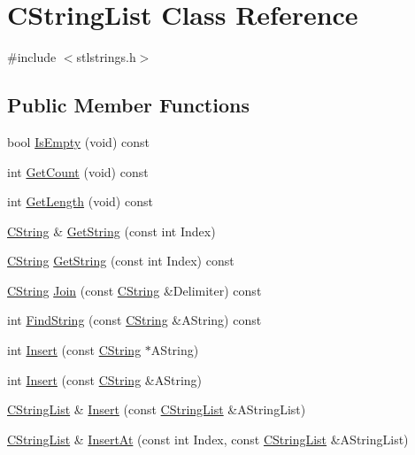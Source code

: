\hypertarget{classCStringList}{\section{C\-String\-List Class Reference}
\label{classCStringList}
}


{\ttfamily \#include $<$stlstrings.\-h$>$}

\subsection*{Public Member Functions}
\begin{DoxyCompactItemize}
\item 
bool \hyperlink{classCStringList_a9aad005c9fc328d8c1fff768444d1bc7}{Is\-Empty} (void) const 
\item 
int \hyperlink{classCStringList_a8a5c522ad2de73b4d27d73101a3e7f19}{Get\-Count} (void) const 
\item 
int \hyperlink{classCStringList_a166f5b12d4505567b01c149204418282}{Get\-Length} (void) const 
\item 
\hyperlink{classCString}{C\-String} \& \hyperlink{classCStringList_a92cf7329bf278bc02f364f64a328f5d8}{Get\-String} (const int Index)
\item 
\hyperlink{classCString}{C\-String} \hyperlink{classCStringList_a0050c77f44595ac8b6a83fd358ba020e}{Get\-String} (const int Index) const 
\item 
\hyperlink{classCString}{C\-String} \hyperlink{classCStringList_ae23be469222e1225008d6ff7c2e619f8}{Join} (const \hyperlink{classCString}{C\-String} \&Delimiter) const 
\item 
int \hyperlink{classCStringList_ab46abd6f167dee53d121c1edd2a7bdf2}{Find\-String} (const \hyperlink{classCString}{C\-String} \&A\-String) const 
\item 
int \hyperlink{classCStringList_a5558c06f3bf9a26ef1d226bed05b7e5b}{Insert} (const \hyperlink{classCString}{C\-String} $\ast$A\-String)
\item 
int \hyperlink{classCStringList_a3273bc85fb10f82a99d00b7c4dc69c39}{Insert} (const \hyperlink{classCString}{C\-String} \&A\-String)
\item 
\hyperlink{classCStringList}{C\-String\-List} \& \hyperlink{classCStringList_aec23e4c991eb5f869b5bf2c74723be47}{Insert} (const \hyperlink{classCStringList}{C\-String\-List} \&A\-String\-List)
\item 
\hyperlink{classCStringList}{C\-String\-List} \& \hyperlink{classCStringList_a067dd43d107bfd9a87cbfdb9517039c1}{Insert\-At} (const int Index, const \hyperlink{classCStringList}{C\-String\-List} \&A\-String\-List)

\end{DoxyCompactItemize}
